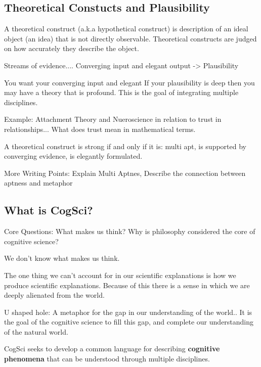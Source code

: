 \documentclass[twoside]{article}
\begin{document}
\subsection{Theoretical Constucts and Plausibility}

A theoretical construct (a.k.a hypothetical construct) is description of
an ideal object (an idea) that is not directly observable. Theoretical constructs
are judged on how accurately they describe the object.

Streams of evidence....
Converging input and elegant output -> Plausibility

You want your converging input and elegant
If your plausibility is deep then you may have a theory that is profound. This is
the goal of integrating multiple disciplines.

Example: Attachment Theory and Nueroscience in relation to trust in relationships...
What does trust mean in mathematical terms.

A theoretical construct is strong if and only if it is: multi apt, is supported by converging evidence, is
elegantly formulated.

More Writing Points: Explain Multi Aptnes, Describe the connection between aptness
and metaphor

\subsection{What is CogSci?}

Core Questions: What makes us think? Why is philosophy considered the core
of cognitive science?

We don't know what makes us think.

The one thing we can't account for in our scientific explanations is
how we produce scientific explanations. Because of this there is
a sense in which we are deeply alienated from the world.

U shaped hole: A metaphor for the gap in our understanding of the world.. It is
the goal of the cognitive science to fill this gap, and complete our understanding of
the natural world.

CogSci seeks to develop a common language for describing \textbf{cognitive phenomena}
that can be understood through multiple disciplines.
\end{document}
